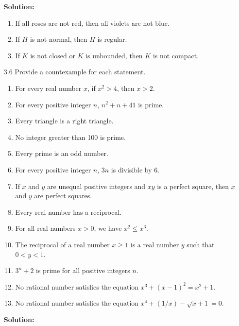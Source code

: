 \begin{enumerate}
      \textbf{Solution:} 

      \begin{enumerate}
         \item If all roses are not red, then all violets are not blue.
         \item If $H$ is not normal, then $H$ is regular.
         \item If $K$ is not closed or $K$ is unbounded, then $K$ is not
               compact.
      \end{enumerate}
   \item[3.6] Provide a countexample for each statement.
      \begin{enumerate}
         \item For every real number $x$, if $x^2 > 4$, then $x > 2$.
         \item For every positive integer $n$, $n^2 + n + 41$ is prime.
         \item Every triangle is a right triangle.
         \item No integer greater than 100 is prime.
         \item Every prime is an odd number.
         \item For every positive integer $n$, $3n$ is divisible by 6.
         \item If $x$ and $y$ are unequal positive integers and $xy$ is a
               perfect square, then $x$ and $y$ are perfect squares.
         \item Every real number has a reciprocal.
         \item For all real numbers $x > 0$, we have $x^2 \le x^3$.
         \item The reciprocal of a real number $x \ge 1$ is a real number $y$
               such that $0 < y < 1$.
         \item $3^n + 2$ is prime for all positive integers $n$.
         \item No rational number satisfies the equation
               $x^3 + (x - 1)^2 = x^2 + 1$.
         \item No rational number satisfies the equation
               $x^4 + (1/x) - \sqrt{x + 1} = 0$.
      \end{enumerate}

      \textbf{Solution:}


\end{enumerate}
